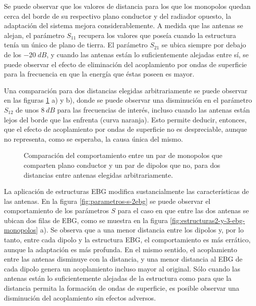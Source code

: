 Se puede observar que los valores de distancia para los que los monopolos quedan cerca del borde de su respectivo plano conductor y del radiador opuesto, la adaptación del sistema mejora considerablemente. A medida que las antenas se alejan, el parámetro $S_{11}$ recupera los valores que poseía cuando la estructura tenía un único de plano de tierra. El parámetro $S_{21}$ se ubica siempre por debajo de los $-20\;dB$, y cuando las antenas están lo suficientemente alejadas entre sí, se puede observar el efecto de eliminación del acoplamiento por ondas de superficie para la frecuencia en que la energía que éstas poseen es mayor.

Una comparación para dos distancias elegidas arbitrariamente se puede observar en las figuras \ref{fig:comparacion-monopolos-s-sinGND} a) y b), donde se puede observar una disminución en el parámetro $S_{12}$ de unos $8\ dB$ para las frecuencias de interés, incluso cuando las antenas están lejos del borde que las enfrenta (curva naranja). Esto permite deducir, entonces, que el efecto de acoplamiento por ondas de superficie no es despreciable, aunque no representa, como se esperaba, la causa única del mismo.


\begin{figure}[H]
	\centering 
	\hspace{0pt}
	\caption{Comparación del comportamiento entre un par de monopolos que comparten plano conductor y un par de dipolos que no, para dos distancias entre antenas elegidas arbitrariamente.}
	\label{fig:comparacion-monopolos-s-sinGND}
\end{figure} 


La aplicación de estructuras EBG modifica sustancialmente las características de las antenas. En la figura \ref{fig:parametros-s-2ebg} se puede observar el comportamiento de los parámetros $S$ para el caso en que entre las dos antenas se ubican dos filas de EBG, como se muestra en la figura \ref{fig:estructuras2-y-3-ebg-monopolos} a). Se observa que a una menor distancia entre los dipolos y, por lo tanto, entre cada dipolo y la estructura EBG, el comportamiento es más errático, aunque la adaptación es más profunda. En el mismo sentido, el acoplamiento entre las antenas disminuye con la distancia, y una menor distancia al EBG de cada dipolo genera un acoplamiento incluso mayor al original. Sólo cuando las antenas están lo suficientemente alejadas de la estructura como para que la distancia permita la formación de ondas de superficie, es posible observar una disminución del acoplamiento sin efectos adversos.

